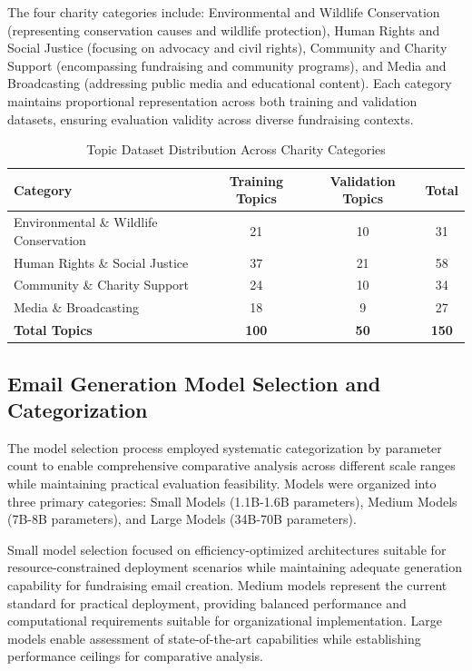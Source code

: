 The four charity categories include: Environmental and Wildlife Conservation (representing conservation causes and wildlife protection), Human Rights and Social Justice (focusing on advocacy and civil rights), Community and Charity Support (encompassing fundraising and community programs), and Media and Broadcasting (addressing public media and educational content). Each category maintains proportional representation across both training and validation datasets, ensuring evaluation validity across diverse fundraising contexts.

\begin{table}[H]
    \centering
    \small
    \begin{tabular}{|l|c|c|c|}
    \hline
    \textbf{Category} & \textbf{Training Topics} & \textbf{Validation Topics} & \textbf{Total} \\
    \hline
    Environmental \& Wildlife Conservation & 21 & 10 & 31 \\
    Human Rights \& Social Justice & 37 & 21 & 58 \\
    Community \& Charity Support & 24 & 10 & 34 \\
    Media \& Broadcasting & 18 & 9 & 27 \\
    \hline
    \textbf{Total Topics} & \textbf{100} & \textbf{50} & \textbf{150} \\
    \hline
    \end{tabular}
    \caption[Topic Dataset Distribution]{Topic Dataset Distribution Across Charity Categories}
    \label{tab:topic-distribution}
\end{table}

\subsection{Email Generation Model Selection and Categorization}

The model selection process employed systematic categorization by parameter count to enable comprehensive comparative analysis across different scale ranges while maintaining practical evaluation feasibility. Models were organized into three primary categories: Small Models (1.1B-1.6B parameters), Medium Models (7B-8B parameters), and Large Models (34B-70B parameters).

Small model selection focused on efficiency-optimized architectures suitable for resource-constrained deployment scenarios while maintaining adequate generation capability for fundraising email creation. Medium models represent the current standard for practical deployment, providing balanced performance and computational requirements suitable for organizational implementation. Large models enable assessment of state-of-the-art capabilities while establishing performance ceilings for comparative analysis.

